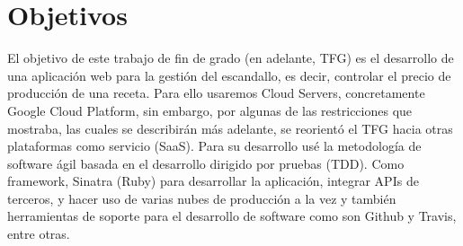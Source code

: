 

%

\section{Objetivos}\label{cap.1.1}
El objetivo de este trabajo de fin de grado (en adelante, TFG) es el desarrollo de una aplicación web para la gestión del escandallo, es decir, controlar el precio de producción de una receta. Para ello usaremos Cloud Servers, concretamente Google Cloud Platform, sin embargo, por algunas de las restricciones que mostraba, las cuales se describirán más adelante, se reorientó el TFG hacia otras plataformas como servicio (SaaS). Para su desarrollo usé la metodología de software ágil basada en el desarrollo dirigido por pruebas (TDD). Como framework, Sinatra (Ruby) para desarrollar la aplicación, integrar APIs de terceros, y hacer uso de varias nubes de producción a la vez y también herramientas de soporte para el desarrollo de software como son Github y Travis, entre otras.

\vspace*{0.2in}
